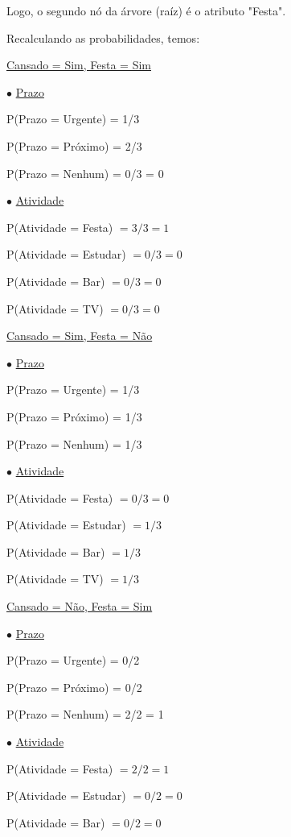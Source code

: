 \documentclass{article}
\begin{document}
\bigskip
\qquad Logo, o segundo nó da árvore (raíz) é o atributo "Festa".

\bigskip
\quad Recalculando as probabilidades, temos:

\bigskip
\quad \underline{Cansado = Sim, Festa = Sim}

\qquad $\bullet$ \underline{Prazo}

\quad \qquad P(Prazo = Urgente) = 1/3

\quad \qquad P(Prazo = Próximo) = 2/3

\quad \qquad P(Prazo = Nenhum) = 0/3 = 0

\bigskip
\qquad $\bullet$ \underline{Atividade}

\quad \qquad P(Atividade = Festa) $= 3/3 = 1$

\quad \qquad P(Atividade = Estudar) $= 0/3 = 0$

\quad \qquad P(Atividade = Bar) $= 0/3 = 0$

\quad \qquad P(Atividade = TV) $= 0/3 = 0$

\bigskip
\quad \underline{Cansado = Sim, Festa = Não}

\qquad $\bullet$ \underline{Prazo}

\quad \qquad P(Prazo = Urgente) = 1/3

\quad \qquad P(Prazo = Próximo) = 1/3

\quad \qquad P(Prazo = Nenhum) = 1/3

\bigskip
\qquad $\bullet$ \underline{Atividade}

\quad \qquad P(Atividade = Festa) $= 0/3 = 0$

\quad \qquad P(Atividade = Estudar) $= 1/3$

\quad \qquad P(Atividade = Bar) $= 1/3$

\quad \qquad P(Atividade = TV) $= 1/3$

\bigskip
\quad \underline{Cansado = Não, Festa = Sim}

\qquad $\bullet$ \underline{Prazo}

\quad \qquad P(Prazo = Urgente) = 0/2

\quad \qquad P(Prazo = Próximo) = 0/2

\quad \qquad P(Prazo = Nenhum) = 2/2 = 1

\bigskip
\qquad $\bullet$ \underline{Atividade}

\quad \qquad P(Atividade = Festa) $= 2/2 = 1$

\quad \qquad P(Atividade = Estudar) $= 0/2 = 0$

\quad \qquad P(Atividade = Bar) $= 0/2 = 0$
\end{document}
